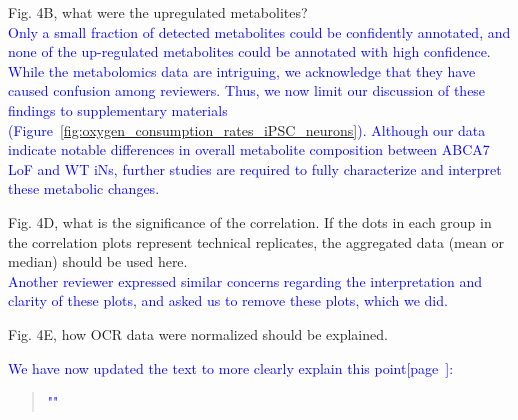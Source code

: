 Fig. 4B, what were the upregulated metabolites?\\
\textcolor{blue}{Only a small fraction of detected metabolites could be confidently annotated, and none of the up-regulated metabolites could be annotated with high confidence. While the metabolomics data are intriguing, we acknowledge that they have caused confusion among reviewers. Thus, we now limit our discussion of these findings to supplementary materials (Figure~\ref{fig:oxygen_consumption_rates_iPSC_neurons}). Although our data indicate notable differences in overall metabolite composition between ABCA7 LoF and WT iNs, further studies are required to fully characterize and interpret these metabolic changes.} 

Fig. 4D, what is the significance of the correlation. If the dots in each group in the correlation plots represent technical replicates, the aggregated data (mean or median) should be used here.\\
\textcolor{blue}{Another reviewer expressed similar concerns regarding the interpretation and clarity of these plots, and asked us to remove these plots, which we did.}

Fig. 4E, how OCR data were normalized should be explained.

\textcolor{blue}{We have now updated the text to more clearly explain this point[page~\pageref{quoteC-label}]:}
\begin{quote}
	\textcolor{blue}{"\quoteC"}
\end{quote}

